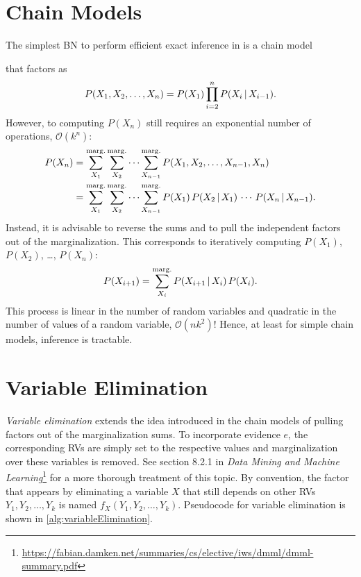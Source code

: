 	\section{Chain Models}
		The simplest BN to perform efficient exact inference in is a chain model
		\begin{center}
		\end{center}
		that factors as
		\begin{equation}
			P(X_1, X_2, \dots, X_n) = P(X_1) \prod_{i = 2}^{n} P(X_i \,\vert\, X_{i - 1}).
		\end{equation}
		However, to computing \(P(X_n)\) still requires an exponential number of operations, \( \mathcal{O}(k^n) \):
		\begin{align}
			P(X_n)
				&= \sum_{X_1}^{\operatorname{marg.}} \sum_{X_2}^{\operatorname{marg.}} \cdots \sum_{X_{n - 1}}^{\operatorname{marg.}} P(X_1, X_2, \dots, X_{n - 1}, X_n) \\
				&= \sum_{X_1}^{\operatorname{marg.}} \sum_{X_2}^{\operatorname{marg.}} \cdots \sum_{X_{n - 1}}^{\operatorname{marg.}} P(X_1) \, P(X_2 \,\vert\, X_1) \, \cdots \, P(X_n \,\vert\, X_{n - 1}).
		\end{align}
		Instead, it is advisable to reverse the sums and to pull the independent factors out of the marginalization. This corresponds to iteratively computing \( P(X_1) \), \( P(X_2) \), \dots, \( P(X_n) \):
		\begin{equation}
			P(X_{i + 1}) = \sum_{X_i}^{\operatorname{marg.}} P(X_{i + 1} \,\vert\, X_i) \, P(X_i).
		\end{equation}
		This process is linear in the number of random variables and quadratic in the number of values of a random variable, \( \mathcal{O}(nk^2) \)! Hence, at least for simple chain models, inference is tractable.

	\section{Variable Elimination}
		\label{sec:variableElimination}

		\emph{Variable elimination} extends the idea introduced in the chain models of pulling factors out of the marginalization sums. To incorporate evidence \(e\), the corresponding RVs are simply set to the respective values and marginalization over these variables is removed. See section 8.2.1 in \emph{Data Mining and Machine Learning}\footnote{\url{https://fabian.damken.net/summaries/cs/elective/iws/dmml/dmml-summary.pdf}} for a more thorough treatment of this topic. By convention, the factor that appears by eliminating a variable \(X\) that still depends on other RVs \( Y_1, Y_2, \dots, Y_k \) is named \( f_X(Y_1, Y_2, \dots, Y_k) \). Pseudocode for variable elimination is shown in \autoref{alg:variableElimination}.

